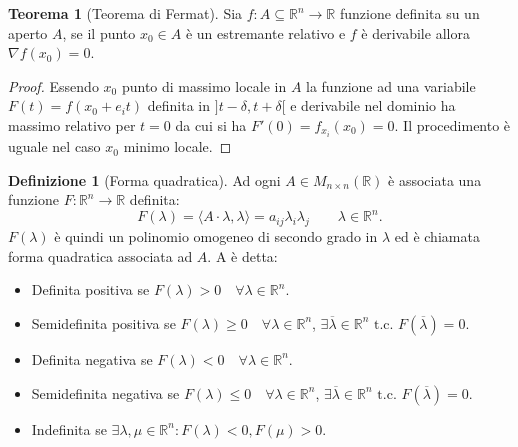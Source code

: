 \documentclass[leqno]{article}
\theoremstyle{definition}
\newtheorem{definition}{Definizione}[section]
\numberwithin{equation}{section}
\newtheorem{theorem}{Teorema}[section]
\theoremstyle{remark}
\begin{document}
	\begin{theorem}[Teorema di Fermat]
		Sia $f:A\subseteq \mathbb{R}^n \rightarrow \mathbb{R}$ funzione definita su un aperto $A$, se il punto $x_0 \in A$ è un estremante relativo e $f$ è derivabile allora $\nabla f(x_0)=0$.
		
	\end{theorem}
	\begin{proof}
		Essendo $x_0$ punto di massimo locale in $A$ la funzione ad una variabile $F(t)=f(x_0+e_it)$ definita in $]t-\delta,t+\delta[$ e derivabile nel dominio ha massimo relativo per $t=0$ da cui si ha $F'(0)=f_{x_i}(x_0)=0$. Il procedimento è uguale nel caso $x_0$ minimo locale.
	\end{proof}
	\begin{definition}[Forma quadratica]
		Ad ogni $A \in M_{n \times n}(\mathbb{R})$ è associata una funzione $F:\mathbb{R}^n \rightarrow \mathbb{R}$ definita: 
		\begin{equation}
			F(\lambda)= \langle A \cdot \lambda , \lambda \rangle = a_{ij}\lambda_i \lambda_j \quad \quad \lambda \in \mathbb{R}^n.
		\end{equation} 
		$F(\lambda)$ è quindi un polinomio omogeneo di secondo grado in $\lambda$ ed è chiamata forma quadratica associata ad $A$. A è detta: 
		\begin{itemize}
			\item Definita positiva se $F(\lambda)>0 \quad \forall \lambda \in \mathbb{R}^n$.
			\item Semidefinita positiva se $F(\lambda) \ge 0 \quad \forall \lambda \in \mathbb{R}^n$, $\exists \overline{\lambda} \in \mathbb{R}^n \text{ t.c. } F(\overline{\lambda})=0$.
			\item Definita negativa se $F(\lambda)<0 \quad \forall \lambda \in \mathbb{R}^n$.
			\item Semidefinita negativa se $F(\lambda)\le 0 \quad \forall \lambda \in \mathbb{R}^n$, $\exists \overline{\lambda} \in \mathbb{R}^n \text{ t.c. } F(\overline{\lambda})=0$.
			\item Indefinita se $\exists \lambda, \mu \in \mathbb{R}^n : F(\lambda) < 0 , F(\mu) > 0$.
		\end{itemize}
	\end{definition}
	
\end{document}

